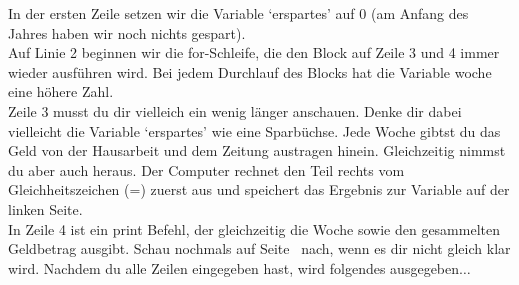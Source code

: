 In der ersten Zeile setzen wir die Variable `erspartes' auf 0 (am Anfang des Jahres haben wir noch nichts gespart).\\
Auf Linie 2 beginnen wir die for-Schleife, die den Block auf Zeile 3 und 4 immer wieder ausführen wird. Bei jedem Durchlauf des Blocks hat die Variable woche eine höhere Zahl.\\
Zeile 3 musst du dir vielleich ein wenig länger anschauen. Denke dir dabei vielleicht die Variable `erspartes' wie eine Sparbüchse. Jede Woche gibtst du das Geld von der Hausarbeit und dem Zeitung austragen hinein. Gleichzeitig nimmst du aber auch  heraus. Der Computer rechnet den Teil rechts vom Gleichheitszeichen (=) zuerst aus und speichert das Ergebnis zur Variable auf der linken Seite.\\
In Zeile 4 ist ein print Befehl, der gleichzeitig die Woche sowie den gesammelten Geldbetrag ausgibt. Schau nochmals auf Seite~\pageref{trickswithstrings} nach, wenn es dir nicht gleich klar wird. Nachdem du alle Zeilen eingegeben hast, wird folgendes ausgegeben$\ldots$

